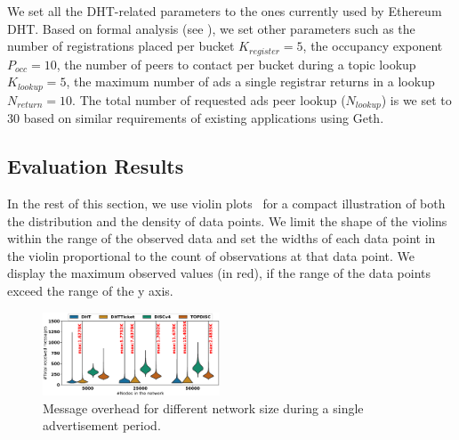 We set all the DHT-related parameters to the ones currently used by Ethereum DHT.%
Based on formal analysis (see ), we set other \sysname parameters such as the number of registrations placed per bucket $K_\textit{register}= 5$, the occupancy exponent $P_\textit{occ} = 10$, the number of peers to contact per bucket during a topic lookup $K_\textit{lookup}=5$, the maximum number of ads a single registrar returns in a lookup $N_\textit{return}=10$. The total number of requested ads peer lookup (\ie $N_\textit{lookup}$) is we set to 30 based on similar requirements of existing applications using Geth.


\subsection{Evaluation Results}

In the rest of this section, we use violin plots~\cite{violin-plots} for a compact illustration of both the distribution and the density of data points. We limit the shape of the violins within the range of the observed data and set the widths of each data point in the violin proportional to the count of observations at that data point. 
We display the maximum observed values (in red), if the range of the data points exceed the range of the y axis. 


\begin{figure}[!h]
\centering
\includegraphics[width=0.470\textwidth]{results/no_split/violin_size_totalMsg.eps}
\caption{Message overhead for different network size during a single advertisement period.}
\label{fig:msgsPerSize}
\vspace{-0.05in}
\end{figure}

